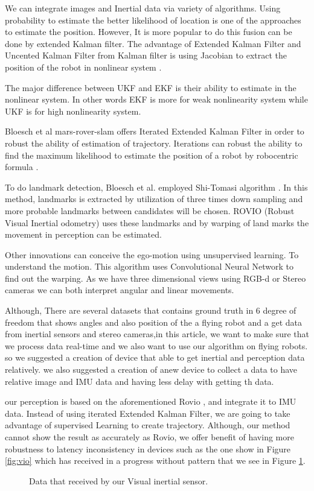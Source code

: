 \documentclass[a4paper,twoside]{article}
\begin{document}
We can integrate images and Inertial data via variety of algorithms. Using probability to estimate the better likelihood of location\cite{bowman2017probabilistic} is one of the approaches to estimate the position. However, It is more popular to do this fusion can be done by extended Kalman filter\cite{lynen2013robust}. The advantage of Extended Kalman Filter and Uncented Kalman Filter from Kalman filter is using Jacobian to extract the position of the robot in nonlinear system \cite{julier2004unscented,wan2000unscented}.

 The major difference between UKF and EKF is their ability to estimate in the nonlinear system. In other words EKF is more for weak nonlinearity system while UKF is for high nonlinearity system. \cite{st2004comparison}
 
Bloesch et al \cite{rovio15,rovio17}mars-rover-slam  offers Iterated Extended Kalman Filter in order to robust the ability of estimation of trajectory. Iterations can robust the ability to find the maximum likelihood to estimate the position of a robot by robocentric formula \cite{rovio15,rovio17}. 


To do landmark detection, Bloesch et al.  employed Shi-Tomasi algorithm \cite{shi1993good}. In this method, landmarks is extracted by utilization of three times down sampling and more probable landmarks between candidates will be chosen. ROVIO (Robust Visual Inertial odometry) uses these landmarks and by warping of land marks the movement in perception can be estimated.

Other innovations can conceive the ego-motion \cite{zhou2017unsupervised} using unsupervised learning. To understand the motion. This algorithm uses Convolutional Neural Network to find out the warping. As we have three dimensional views using RGB-d or Stereo cameras we can both interpret angular and linear movements.

Although, There are several datasets that contains ground truth in 6 degree of freedom that shows angles and also position of the a flying robot and a get data from inertial sensors and stereo cameras\cite{euroc},in this article, we want to make sure that we process data real-time and we also want to use our algorithm on flying robots. so we suggested a creation of device that able to get inertial and perception data relatively. we also suggested a creation of anew device to collect a data to have relative image and IMU data and having less delay with getting th data.

 our perception is based on the aforementioned Rovio \cite{rovio17}, and integrate it to IMU data.  Instead of using iterated Extended Kalman Filter, we are going to take advantage of supervised Learning  to create trajectory.
 Although, our method cannot show the result as accurately as Rovio, we offer benefit of having more robustness to latency inconsistency in devices such as the one show in Figure \ref{fig:vio} which has received in a progress without pattern that we see in Figure \ref{fig:incons}. 
 




\begin{figure}[!h]
  \centering
   {}
  \caption{Data that received by our Visual inertial sensor.}
  \label{fig:incons}
 \end{figure}




{\small
}
\end{document}

